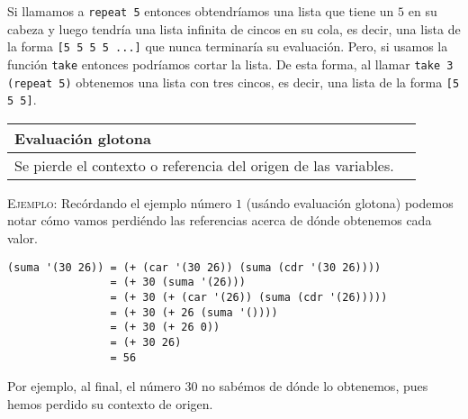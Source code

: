 \documentclass[letterpaper,11pt]{article}
\begin{document}
Si llamamos a \texttt{repeat 5} entonces obtendríamos una lista que tiene un 
$5$ en su cabeza y luego tendría una lista infinita de cincos en su cola, es 
decir, una lista de la forma \texttt{[5 5 5 5 ...]} que nunca terminaría su 
evaluación. Pero, si usamos la función \texttt{take} entonces podríamos cortar 
la lista. De esta forma, al llamar \texttt{take 3 (repeat 5)} obtenemos una 
lista con tres cincos, es decir, una lista de la forma \texttt{[5 5 5]}.

\begin{table}[h]
    \centering  
    \begin{tabular}{|L|L|}
        \hline
        Evaluación glotona \\
        \hline 
        Se pierde el contexto o referencia del origen de las variables. \\
        \hline
    \end{tabular}
\end{table}

\textsc{Ejemplo:} Recórdando el ejemplo número $1$ (usándo evaluación glotona) 
podemos notar cómo vamos perdiéndo las referencias acerca de dónde obtenemos 
cada valor. 
\begin{verbatim}
(suma '(30 26)) = (+ (car '(30 26)) (suma (cdr '(30 26))))
                = (+ 30 (suma '(26)))
                = (+ 30 (+ (car '(26)) (suma (cdr '(26)))))
                = (+ 30 (+ 26 (suma '())))
                = (+ 30 (+ 26 0))
                = (+ 30 26)
                = 56
\end{verbatim}
 
Por ejemplo, al final, el número $30$ no sabémos de dónde lo obtenemos, pues 
hemos perdido su contexto de origen.
\end{document}
